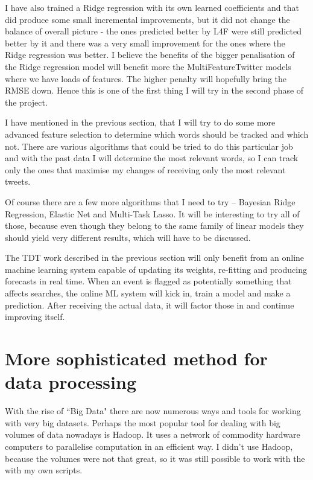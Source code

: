 \documentclass[minf,twoside,singlespacing,parskip,frontabs,notimes,11pt]{infthesis}
\begin{document}
I have also trained a Ridge regression with its own learned coefficients and that did produce some small incremental improvements, but it did not change the balance of overall picture - the ones predicted better by L4F were still predicted better by it and there was a very small improvement for the ones where the Ridge regression was better. I believe the benefits of the bigger penalisation of the Ridge regression model will benefit more the MultiFeatureTwitter models where we have loads of features. The higher penalty will hopefully bring the RMSE down. Hence this is one of the first thing I will try in the second phase of the project. 


I have mentioned in the previous section, that I will try to do some more advanced feature selection to determine which words should be tracked and which not. There are various algorithms that could be tried to do this particular job and with the past data I will determine the most relevant words, so I can track only the ones that maximise my changes of receiving only the most relevant tweets. 


Of course there are a few more algorithms that I need to try -- Bayesian Ridge Regression, Elastic Net and Multi-Task Lasso. It will be interesting to try all of those, because even though they belong to the same family of linear models they should yield very different results, which will have to be discussed. 


The TDT work described in the previous section will only benefit from an online machine learning system capable of updating its weights, re-fitting and producing forecasts in real time. When an event is flagged as potentially something that affects searches, the online ML system will kick in, train a model and make a prediction. After receiving the actual data, it will factor those in and continue improving itself.



\section{More sophisticated method for data processing}


With the rise of ``Big Data" there are now numerous ways and tools for working with very big datasets. Perhaps the most popular tool for dealing with big volumes of data nowadays is Hadoop. It uses a network of commodity hardware computers to parallelise computation in an efficient way. I didn't use Hadoop, because the volumes were not that great, so it was still possible to work with the with my own scripts. 
\end{document}
